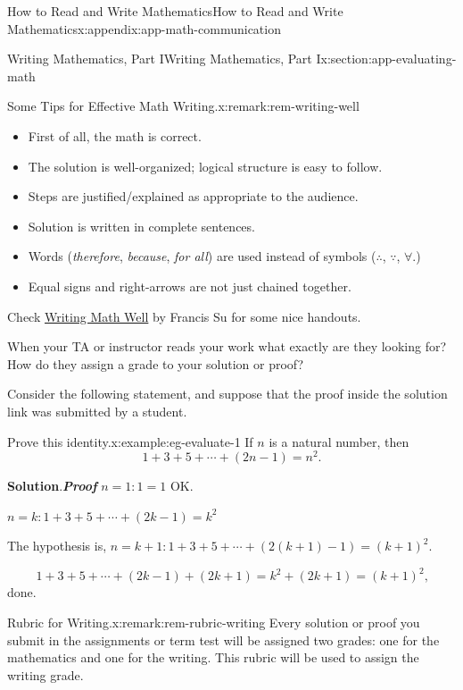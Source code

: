 \documentclass[oneside,10pt,]{book}
\newcommand{\blocktitlefont}{\relax}
\newcommand{\alert}[1]{\textbf{\textit{#1}}}
\numberwithin{equation}{section}
\begin{document}
\begin{appendixptx}{How to Read and Write Mathematics}{}{How to Read and Write Mathematics}{}{}{x:appendix:app-math-communication}
\begin{sectionptx}{Writing Mathematics, Part I}{}{Writing Mathematics, Part I}{}{}{x:section:app-evaluating-math}
\begin{remark}{Some Tips for Effective Math Writing.}{x:remark:rem-writing-well}
%
\begin{itemize}[label=\textbullet]
\item{}First of all, the math is correct.%
\item{}The solution is well-organized; logical structure is easy to follow.%
\item{}Steps are justified\slash{}explained as appropriate to the audience.%
\item{}Solution is written in complete sentences.%
\item{}Words (\emph{therefore}, \emph{because}, \emph{for all}) are used instead of symbols (\(\therefore\), \(\because\), \(\forall\).)%
\item{}Equal signs and right-arrows are not just chained together.%
\end{itemize}
Check \href{https://math.hmc.edu/su/writing-math-well/}{Writing Math Well} by Francis Su for some nice handouts.%
\end{remark}
When your TA or instructor reads your work what exactly are they looking for? How do they assign a grade to your solution or proof?%
\par
Consider the following statement, and suppose that the proof inside the solution link was submitted by a student.%
\begin{example}{Prove this identity.}{x:example:eg-evaluate-1}%
If \(n\) is a natural number, then%
\begin{equation*}
1 + 3 + 5 + \cdots + (2n-1) = n^2\text{.}
\end{equation*}
%
\par\smallskip%
\noindent\textbf{\blocktitlefont Solution}.\hypertarget{g:solution:id550597}{}\quad{}\alert{Proof} \(n = 1: 1 = 1\) OK.%
\par
\(n = k: 1 + 3 + 5 + \cdots + (2k-1) = k^2\)%
\par
The hypothesis is, \(n = k + 1: 1 + 3 + 5 + \cdots + (2(k+1) - 1) = (k+1)^2\).%
\par
%
\begin{equation*}
1 + 3 + 5 + \cdots + (2k-1) + (2k+1) = k^2 + (2k + 1) = (k+1)^2\text{,}
\end{equation*}
done.%
\end{example}
\begin{remark}{Rubric for Writing.}{x:remark:rem-rubric-writing}%
Every solution or proof you submit in the assignments or term test will be assigned two grades: one for the mathematics and one for the writing. This rubric will be used to assign the writing grade.%
\par

\end{remark}
\end{sectionptx}
\end{appendixptx}
\end{document}
